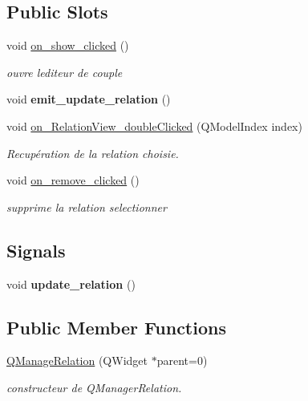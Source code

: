 \subsection*{Public Slots}
\begin{DoxyCompactItemize}
\item 
void \hyperlink{class_q_manage_relation_ab901c21b731bde77d9c1bc68780ec700}{on\+\_\+show\+\_\+clicked} ()
\begin{DoxyCompactList}\small\item\em ouvre l\textquotesingle{}editeur de couple \end{DoxyCompactList}\item 
\mbox{\label{class_q_manage_relation_a1233b4965e2160a022a52b73d4812c8e}} 
void {\bfseries emit\+\_\+update\+\_\+relation} ()
\item 
void \hyperlink{class_q_manage_relation_a45a9416aa18e0d6729ef5d0f9c37e626}{on\+\_\+\+Relation\+View\+\_\+double\+Clicked} (Q\+Model\+Index index)
\begin{DoxyCompactList}\small\item\em Recupération de la relation choisie. \end{DoxyCompactList}\item 
void \hyperlink{class_q_manage_relation_a0ad8c5f51b68248b2d42e980d99e4820}{on\+\_\+remove\+\_\+clicked} ()
\begin{DoxyCompactList}\small\item\em supprime la relation selectionner \end{DoxyCompactList}\end{DoxyCompactItemize}
\subsection*{Signals}
\begin{DoxyCompactItemize}
\item 
\mbox{\label{class_q_manage_relation_a03b0dc7b3470c608cc801b6c8203234e}} 
void {\bfseries update\+\_\+relation} ()
\end{DoxyCompactItemize}
\subsection*{Public Member Functions}
\begin{DoxyCompactItemize}
\item 
\hyperlink{class_q_manage_relation_af470c7a01389927cd834432d4d37f5c9}{Q\+Manage\+Relation} (Q\+Widget $\ast$parent=0)
\begin{DoxyCompactList}\small\item\em constructeur de Q\+Manager\+Relation. \end{DoxyCompactList}\end{DoxyCompactItemize}


